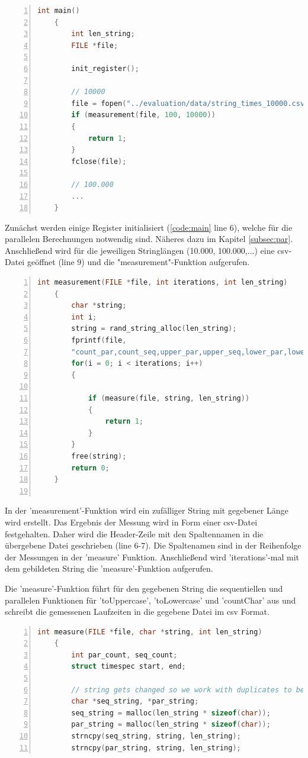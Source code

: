 \documentclass[plainarticle,zihtitle,german,final,hyperref,utf8]{zihpub}
\begin{document}
\label{code:main} %
\begin{lstlisting}[language=c, numbers=left]
	int main()
	{
		int len_string; 	
		FILE *file;
		
		init_register();
		
		// 10000
		file = fopen("../evaluation/data/string_times_10000.csv", "w");
		if (measurement(file, 100, 10000))
		{
			return 1;
		}
		fclose(file);
		
		// 100.000
		...
	}
\end{lstlisting}

Zunächst werden einige Register initialisiert (\ref{code:main} line 6), welche für die parallelen Berechnungen notwendig sind. Näheres dazu im Kapitel \ref{subsec:par}. Anschließend wird für die jeweiligen Stringlängen (10.000, 100.000,...) eine csv-Datei geöffnet (line 9) und die "measurement"-Funktion aufgerufen.

\begin{lstlisting}[language=c, numbers=left]
	int measurement(FILE *file, int iterations, int len_string)
	{
		char *string;
		int i;
		string = rand_string_alloc(len_string);
		fprintf(file,
		"count_par,count_seq,upper_par,upper_seq,lower_par,lower_seq\n");
		for(i = 0; i < iterations; i++)
		{
			
			if (measure(file, string, len_string))
			{
				return 1;
			}
		}
		free(string);
		return 0;
	}
	
\end{lstlisting}

In der 'measurement'-Funktion wird ein zufälliger String mit gegebener Länge wird erstellt.
Das Ergebnis der Messung wird in Form einer csv-Datei festgehalten. Daher wird die Header-Zeile mit den Spaltennamen in die übergebene Datei geschrieben (line 6-7). Die Spaltenamen sind in der Reihenfolge der Messungen in der 'measure' Funktion.
Anschließend wird 'iterations'-mal mit dem gebildeten String die 'measure'-Funktion aufgerufen.

Die 'measure'-Funktion führt für den gegebenen String die sequentiellen und parallelen Funktionen für 'toUppercase', 'toLowercase' und 'countChar' aus und schreibt die gemessenen Laufzeiten in die gegebene Datei im csv Format.
\begin{lstlisting}[language=c, numbers=left]
	int measure(FILE *file, char *string, int len_string)
	{
		int par_count, seq_count;
		struct timespec start, end;
		
		// string gets changed so we work with duplicates to be able to reset
		char *seq_string, *par_string;
		seq_string = malloc(len_string * sizeof(char));
		par_string = malloc(len_string * sizeof(char));
		strncpy(seq_string, string, len_string);
		strncpy(par_string, string, len_string);
\end{lstlisting}
\end{document}
